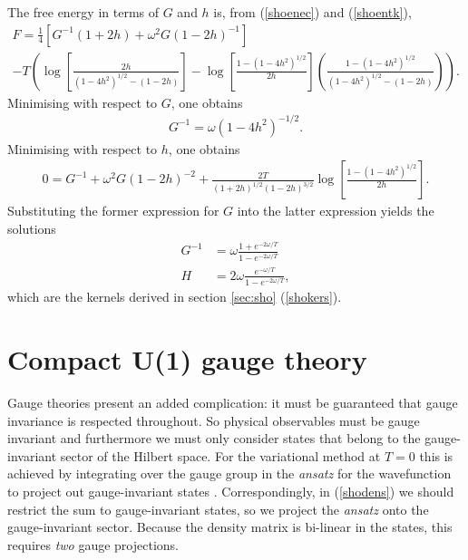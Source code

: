 \documentclass[a4paper,a4paper]{article}
\begin{document}
 The free energy in terms of $G$ and $h$ is, from (\ref{shoenec}) and (\ref{shoentk}),
\begin{multline}
F = \frac{1}{4}\left[ G^{-1}(1 + 2h) + \omega^2 G(1 - 2h)^{-1}\right] \\
- T \left(  \log \left[ \frac{2h}{  (1-4h^2)^{1/2} - (1-2h)}\right] 
- \log \left[ \frac{1- (1-4h^2)^{1/2}}{2h}\right] \left( \frac{1- (1-4h^2)^{1/2}}{(1-4h^2)^{1/2}-(1-2h)} \right) \right).
\end{multline}
Minimising with respect to $G$, one obtains
\begin{gather}
G^{-1} = \omega (1- 4h^2)^{-1/2}.
\end{gather}
Minimising with respect to $h$, one obtains
\begin{gather}
0 = G^{-1} + \omega^2 G (1-2h)^{-2} + \frac{2T}{(1+ 2h)^{1/2} (1-2h)^{3/2}} \log \left[ \frac{1- (1-4h^2)^{1/2}}{2h} \right].
\end{gather}
Substituting the former expression for $G$ into the latter expression 
yields the solutions
\begin{align} \label{shosoln}
G^{-1} &= \omega \frac{1+e^{-2\omega / T}}{1-e^{-2\omega / T}} \nonumber \\
H &= 2 \omega \frac{e^{-\omega / T}}{1-e^{-2\omega / T}},
\end{align}
which are the kernels derived in section \ref{sec:sho} (\ref{shokers}).
%





%
\section{Compact U(1) gauge theory} \label{sec:cQED}
Gauge theories present an added complication: it must be guaranteed that gauge invariance is respected throughout.
So physical observables must be gauge invariant and furthermore we must only consider states that belong
to the gauge-invariant sector of the Hilbert space. 
For the variational method at $T=0$ this is achieved by integrating over the gauge group in the \emph{ansatz} for
the wavefunction to project out gauge-invariant states \cite{Kogan:1995wf}.
Correspondingly, in (\ref{shodens}) we should restrict the sum to
gauge-invariant states, so we project the \emph{ansatz} onto the gauge-invariant sector. 
Because the density matrix is bi-linear in the states, this requires \emph{two} gauge projections.
\end{document}
